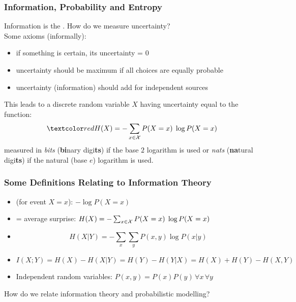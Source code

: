 \begin{frame}
\frametitle{Information, Probability and Entropy}

Information is the . How do we measure
uncertainty?\\

Some axioms (informally):
%
\begin{itemize}
\item if something is certain, its uncertainty = 0 \\[-3.5ex]
\item uncertainty should be maximum if all choices are equally
  probable \\[-3.5ex]
\item uncertainty (information) should add for independent sources
\end{itemize}
%
This leads to a discrete random variable $X$ having uncertainty equal
to the  function:
%
\[
\Red{H(X) = - \sum_{x \in {\cal X}} P(X=x) \; \log P(X=x)}
\]
%
measured in \emph{bits} ({\bf bi}nary digi{\bf ts}) if the base $2$
logarithm is used or \emph{nats} ({\bf na}tural digi{\bf ts})
if the natural (base $e$) logarithm is used.

\end{frame}
\begin{frame}
\frametitle{Some Definitions Relating to Information Theory}

\begin{itemize}
\item {} (for event $X=x$): $- \log P(X=x)$
\item {} = average surprise: $H(X) = - \sum_{x \in {\cal X}} P(X=x) \; \log P(X=x)$
\item {}
\[
H(X|Y) = - \sum_{x} \sum_{y} P(x,y) \log P(x|y)
\]
\item {}
\[
I(X;Y) = H(X) - H(X|Y) = H(Y) - H(Y|X) = H(X)+H(Y)-H(X,Y)
\]
\item Independent random variables: $P(x,y) = P(x) P(y) \, \forall x \,
\forall y$
\end{itemize}

How do we relate information theory and probabilistic modelling?

\end{frame}
